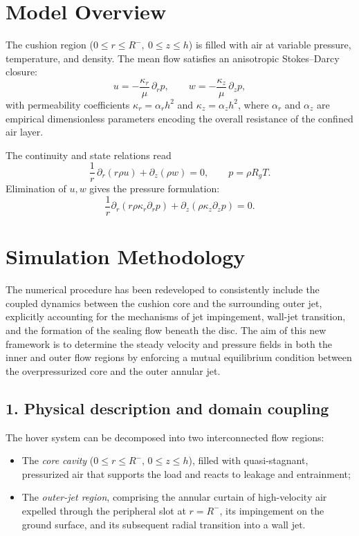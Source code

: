 \documentclass[11pt,a4paper]{article}
\begin{document}
\section{Model Overview}
\label{sec:model-overview}

The cushion region ($0\le r\le R^{-},\ 0\le z\le h$) is filled with air at variable pressure, temperature, and density.
The mean flow satisfies an anisotropic Stokes--Darcy closure:
\begin{equation}
  u = -\frac{\kappa_r}{\mu}\,\partial_r p,\qquad
  w = -\frac{\kappa_z}{\mu}\,\partial_z p,
\end{equation}
with permeability coefficients $\kappa_r=\alpha_r h^2$ and $\kappa_z=\alpha_z h^2$, where $\alpha_r$ and $\alpha_z$ are empirical dimensionless parameters encoding the overall resistance of the confined air layer.

The continuity and state relations read
\begin{equation}
  \frac{1}{r}\,\partial_r\!\left(r\rho u\right)+\partial_z(\rho w)=0,\qquad
  p=\rho R_g T.
\end{equation}
Elimination of $u,w$ gives the pressure formulation:
\begin{equation}
  \frac{1}{r}\partial_r(r\rho\kappa_r\partial_r p)+\partial_z(\rho\kappa_z\partial_z p)=0.
\end{equation}




\section{Simulation Methodology}
\label{sec:simulation-method}

The numerical procedure has been redeveloped to consistently include the coupled dynamics between the cushion core and the surrounding outer jet, explicitly accounting for the mechanisms of jet impingement, wall-jet transition, and the formation of the sealing flow beneath the disc. The aim of this new framework is to determine the steady velocity and pressure fields in both the inner and outer flow regions by enforcing a mutual equilibrium condition between the overpressurized core and the outer annular jet.

\subsection*{1. Physical description and domain coupling}

The hover system can be decomposed into two interconnected flow regions:
\begin{itemize}
    \item The \textit{core cavity} ($0 \le r \le R^-,\, 0 \le z \le h$), filled with quasi-stagnant, pressurized air that supports the load and reacts to leakage and entrainment;
    \item The \textit{outer-jet region}, comprising the annular curtain of high-velocity air expelled through the peripheral slot at $r = R^-$, its impingement on the ground surface, and its subsequent radial transition into a wall jet.
\end{itemize}
\end{document}
